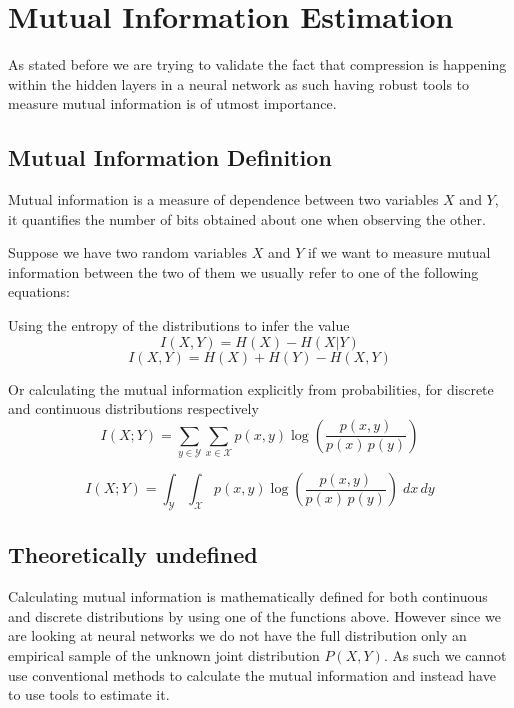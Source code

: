 
\section{Mutual Information Estimation}

As stated before we are trying to validate the fact that compression is
happening within the hidden layers in a neural network as such having robust
tools to measure mutual information is of utmost importance. 

\subsection{Mutual Information Definition}

Mutual information is a measure of dependence between two variables $ X $ and $
Y $, it quantifies the number of bits obtained about one when observing the
other.

Suppose we have two random variables $ X $ and $ Y $ if we want to measure
mutual information between the two of them we usually refer to one of the
following equations:

\medskip

Using the entropy of the distributions to infer the value
\begin{equation}
  I(X, Y) = H(X) - H(X|Y)
\end{equation}
\begin{equation}
  I(X, Y) = H(X) + H(Y) - H(X,Y)
\end{equation}

Or calculating the mutual information explicitly from probabilities, for
discrete and continuous distributions respectively
\begin{equation}
      {I} (X;Y)=\sum _{y\in {\mathcal {Y}}}\sum _{x\in {\mathcal
      {X}}}{p(x,y)\log {\left({\frac {p(x,y)}{p(x)\,p(y)}}\right)}} 
\end{equation}

\begin{equation}
    {I} (X;Y)=\int _{\mathcal {Y}}\int _{\mathcal {X}}{p(x,y)\log {\left({\frac
    {p(x,y)}{p(x)\,p(y)}}\right)}}\;dx\,dy
\end{equation}


\subsection{Theoretically undefined}

Calculating mutual information is mathematically defined for both continuous and
discrete distributions by using one of the functions above. However since we are
looking at neural networks we do not have the full distribution only an
empirical sample of the unknown joint distribution $ P(X,Y) $. As such we cannot
use conventional methods to calculate the mutual information and instead have to
use tools to estimate it.

